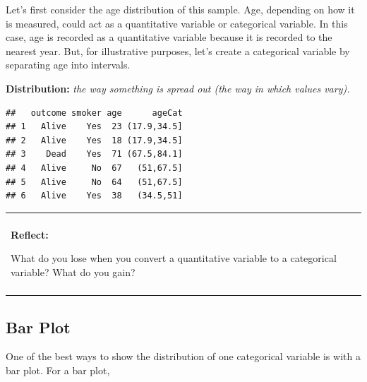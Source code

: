 \documentclass[
]{book}
\newenvironment{Shaded}{\begin{snugshade}}{\end{snugshade}}
\newcommand{\CommentTok}[1]{\textcolor[rgb]{0.56,0.35,0.01}{\textit{#1}}}
\newcommand{\DataTypeTok}[1]{\textcolor[rgb]{0.13,0.29,0.53}{#1}}
\newcommand{\DecValTok}[1]{\textcolor[rgb]{0.00,0.00,0.81}{#1}}
\newcommand{\KeywordTok}[1]{\textcolor[rgb]{0.13,0.29,0.53}{\textbf{#1}}}
\newcommand{\NormalTok}[1]{#1}
\newcommand{\OperatorTok}[1]{\textcolor[rgb]{0.81,0.36,0.00}{\textbf{#1}}}
\newcommand{\StringTok}[1]{\textcolor[rgb]{0.31,0.60,0.02}{#1}}
\newenvironment{reflect}
{
    \begin{center}
    
    \begin{tabular}{|p{0.8\textwidth}|}
    \rowcolor{LightBlue}
    \hline\\
    \rowcolor{LightBlue}
    \textbf{Reflect:}
}
{
    \\\rowcolor{LightBlue}
    \\\hline
    \end{tabular} 
    \end{center}
}
\begin{document}
Let's first consider the age distribution of this sample. Age, depending on how it is measured, could act as a quantitative variable or categorical variable. In this case, age is recorded as a quantitative variable because it is recorded to the nearest year. But, for illustrative purposes, let's create a categorical variable by separating age into intervals.

\textbf{Distribution:} \emph{the way something is spread out (the way in which values vary).}

\begin{Shaded}
\end{Shaded}

\begin{verbatim}
##   outcome smoker age      ageCat
## 1   Alive    Yes  23 (17.9,34.5]
## 2   Alive    Yes  18 (17.9,34.5]
## 3    Dead    Yes  71 (67.5,84.1]
## 4   Alive     No  67   (51,67.5]
## 5   Alive     No  64   (51,67.5]
## 6   Alive    Yes  38   (34.5,51]
\end{verbatim}

\begin{reflect}
What do you lose when you convert a quantitative variable to a
categorical variable? What do you gain?
\end{reflect}

\hypertarget{bar-plot}{%
\subsection{Bar Plot}\label{bar-plot}}

One of the best ways to show the distribution of one categorical variable is with a bar plot. For a bar plot,
\end{document}
